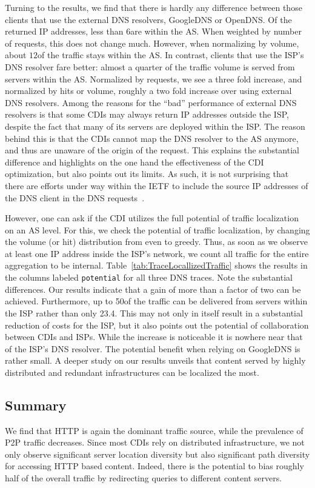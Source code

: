 Turning to the results, we find that there is hardly any difference between
those clients that use the external DNS resolvers, \ie GoogleDNS or OpenDNS. Of
the returned IP addresses, less than $6$\perc are within the AS. When weighted
by number of requests, this does not change much. However, when normalizing by
volume, about $12$\perc of the traffic stays within the AS. In contrast,
clients that use the ISP's DNS resolver fare better: almost a quarter of the
traffic volume is served from servers within the AS. Normalized by requests, we
see a three fold increase, and normalized by hits or volume, roughly a two fold
increase over using external DNS resolvers.  Among the reasons for the ``bad''
performance of external DNS resolvers is that some CDIs may always return IP
addresses outside the ISP, despite the fact that many of its servers are
deployed within the ISP. The reason behind this is that the CDIs cannot map the
DNS resolver to the AS anymore, and thus are unaware of the origin of the
request. This explains the substantial difference and highlights on the one
hand the effectiveness of the CDI optimization, but also points out its
limits. As such, it is not surprising that there are efforts under way within
the IETF to include the source IP addresses of the DNS client in the DNS
requests~\cite{DNS-extension-IP-client}.

However, one can ask if the CDI utilizes the full potential of traffic
localization on an AS level. For this, we check the potential of traffic
localization, by changing the volume (or hit) distribution from even to greedy.
Thus, as soon as we observe at least one IP address inside the ISP's network,
we count all traffic for the entire aggregation to be
internal. Table~\ref{tab:TraceLocallizedTraffic} shows the results in the
columns labeled \texttt {potential} for all three DNS traces. Note the
substantial differences. Our results indicate that a gain of more than a factor
of two can be achieved. Furthermore, up to 50\perc of the traffic can be
delivered from servers within the ISP rather than only 23.4\perc. This may not
only in itself result in a substantial reduction of costs for the ISP, but it
also points out the potential of collaboration between CDIs and ISPs. While the
increase is noticeable it is nowhere near that of the ISP's DNS resolver. The
potential benefit when relying on GoogleDNS is rather small. A deeper study on
our results unveils that content served by highly distributed and redundant
infrastructures can be localized the most.


\subsection{Summary}\label{sec:diversity_summary}
We find that HTTP is again the dominant traffic source, while the prevalence of
P2P traffic decreases. Since most CDIs rely on distributed infrastructure, we
not only observe significant server location diversity but also significant
path diversity for accessing HTTP based content. Indeed, there is the potential
to bias roughly half of the overall traffic by redirecting queries to different
content servers.

